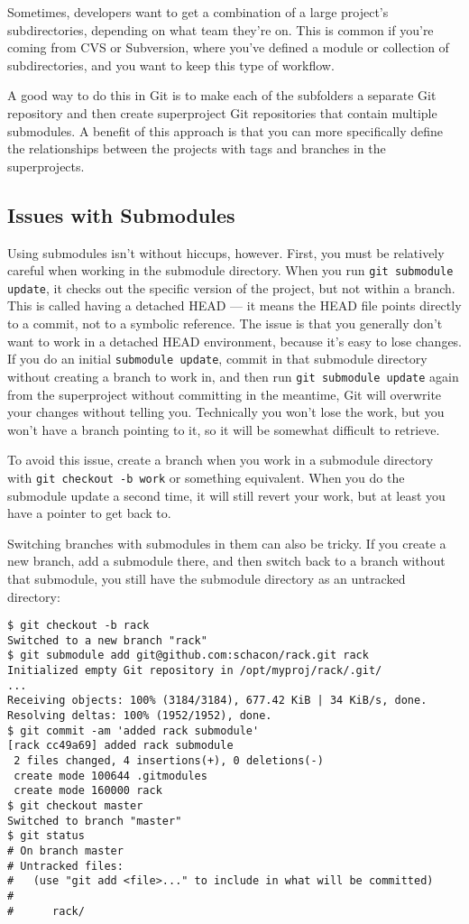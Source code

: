 \documentclass[a4paper]{book}
\begin{document}
Sometimes, developers want to get a combination of a large project's subdirectories, depending on what team they're on. This is common if you're coming from CVS or Subversion, where you've defined a module or collection of subdirectories, and you want to keep this type of workflow.

A good way to do this in Git is to make each of the subfolders a separate Git repository and then create superproject Git repositories that contain multiple submodules. A benefit of this approach is that you can more specifically define the relationships between the projects with tags and branches in the superprojects.

\subsection{Issues with Submodules}

Using submodules isn't without hiccups, however. First, you must be relatively careful when working in the submodule directory. When you run \texttt{git submodule update}, it checks out the specific version of the project, but not within a branch. This is called having a detached HEAD --- it means the HEAD file points directly to a commit, not to a symbolic reference. The issue is that you generally don't want to work in a detached HEAD environment, because it's easy to lose changes. If you do an initial \texttt{submodule update}, commit in that submodule directory without creating a branch to work in, and then run \texttt{git submodule update} again from the superproject without committing in the meantime, Git will overwrite your changes without telling you. Technically you won't lose the work, but you won't have a branch pointing to it, so it will be somewhat difficult to retrieve.

To avoid this issue, create a branch when you work in a submodule directory with \texttt{git checkout -b work} or something equivalent. When you do the submodule update a second time, it will still revert your work, but at least you have a pointer to get back to.

Switching branches with submodules in them can also be tricky. If you create a new branch, add a submodule there, and then switch back to a branch without that submodule, you still have the submodule directory as an untracked directory:

\begin{shaded}\begin{verbatim}
$ git checkout -b rack
Switched to a new branch "rack"
$ git submodule add git@github.com:schacon/rack.git rack
Initialized empty Git repository in /opt/myproj/rack/.git/
...
Receiving objects: 100% (3184/3184), 677.42 KiB | 34 KiB/s, done.
Resolving deltas: 100% (1952/1952), done.
$ git commit -am 'added rack submodule'
[rack cc49a69] added rack submodule
 2 files changed, 4 insertions(+), 0 deletions(-)
 create mode 100644 .gitmodules
 create mode 160000 rack
$ git checkout master
Switched to branch "master"
$ git status
# On branch master
# Untracked files:
#   (use "git add <file>..." to include in what will be committed)
#
#      rack/
\end{verbatim}\end{shaded}
\end{document}
